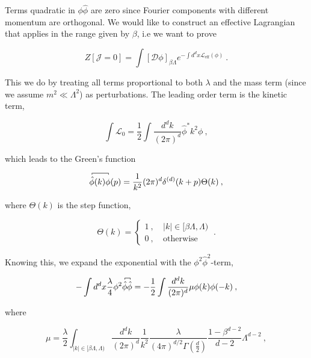 \documentclass[10pt,twoside]{report}
\begin{document}
	Terms quadratic in $\phi\hat{\phi}$ are zero since Fourier components with different momentum are orthogonal. We would like to construct an effective Lagrangian that applies in the range given by $\beta$, i.e we want to prove
	
	\begin{equation}
		Z[\mathcal{J}=0] = \int\left[\mathcal{D}\phi\right]_{\beta\Lambda} e^{-\int d^dx\mathcal{L}_{\text{eff}}(\phi)} \:.
	\end{equation}
	
	This we do by treating all terms proportional to both $\lambda$ and the mass term (since we assume $m^2\ll\Lambda^2$) as perturbations. The leading order term is the kinetic term,
	
	\begin{equation}
		\int\mathcal{L}_0 = \frac{1}{2}\int\frac{d^dk}{(2\pi)^d}\hat{\phi}^*k^2\phi\:,
	\end{equation}
	
	\noindent which leads to the Green's function
	
	\begin{equation}
	\contraction[2pt]{}{\hat{\phi}}{(k)}{\phi}\hat{\phi}(k)\phi(p) = \frac{1}{k^2}(2\pi)^d\delta^{(d)}(k+p)\Theta(k) \:,
	\end{equation}
	
	\noindent where $\Theta(k)$ is the step function,
	
	\begin{equation}
		\Theta(k) = \begin{cases}
		1\:,&\:|k|\in[\beta\Lambda,\Lambda)\\
		0\:,&\:\text{otherwise}
		\end{cases} \:.
	\end{equation}
	
	Knowing this, we expand the exponential with the $\phi^2\hat{\phi}^2$-term,
	
	\begin{equation}
		-\int d^dx \frac{\lambda}{4}\phi^2\contraction[2pt]{}{\hat{\phi}}{}{\hat{\phi}}\hat{\phi}\hat{\phi} = -\frac{1}{2}\int \frac{d^dk}{(2\pi)^d}\mu\phi(k)\phi(-k) \:,
		\label{EFT | eq | phi^2hatphi^2-term}
	\end{equation}
	
	\noindent where
	
	\begin{equation}
		\mu = \frac{\lambda}{2}\int_{|k|\in[\beta\Lambda,\Lambda)}\frac{d^dk}{(2\pi)^d}\frac{1}{k^2}\frac{\lambda}{(4\pi)^{d/2}\Gamma\left(\frac{d}{2}\right)}\frac{1-\beta^{d-2}}{d-2}\Lambda^{d-2}\:,
	\end{equation}
	
\end{document}
